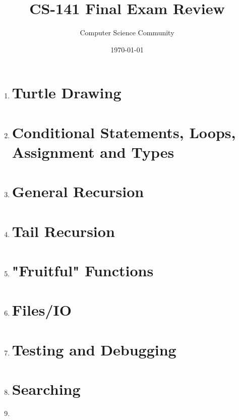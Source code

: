 \documentclass[11pt]{article}
\author{Computer Science Community}
\title{CS-141 Final Exam Review}
\date{\today}
\begin{document}
\header

\begin{enumerate}

\section*{Python Basics}
	\item 

\section*{Turtle Drawing}
	\item 

\section*{Conditional Statements, Loops, Assignment and Types}
	\item 

\section*{General Recursion}
	\item 

\section*{Tail Recursion}
	\item 

\section*{"Fruitful" Functions}
	\item 

\section*{Files/IO}
	\item 

\section*{Testing and Debugging}
	\item 

\section*{Searching}
	\item 


\end{enumerate}
\end{document}
